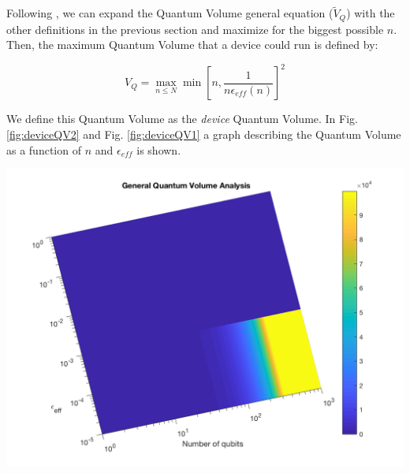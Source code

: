 \documentclass[11pt]{article}
\begin{document}
Following \cite{Bishop_2017,Moll_2018}, we can expand the Quantum Volume general equation (\(\tilde{V}_Q\)) with the other definitions in the previous section and maximize for the biggest possible \(n\). 
Then, the maximum Quantum Volume that a device could run is defined by:

$$V_Q = \max_{n \le N} \min \left[ n,\frac{1}{n \epsilon_{eff} (n)}\right]^2$$

We define this Quantum Volume as the \emph{device} Quantum Volume. 
In Fig. \ref{fig:deviceQV2} and Fig. \ref{fig:deviceQV1} a graph describing the Quantum Volume as a function of \(n\) and \(\epsilon_{eff}\) is shown. 


\begin{minipage}{.45\textwidth}

\centering

\begin{center}
\includegraphics[width=.9\linewidth]{general_QV2.png}
\end{center}

\label{fig:deviceQV2}

\end{minipage}%
\hspace{1cm}
\end{document}
